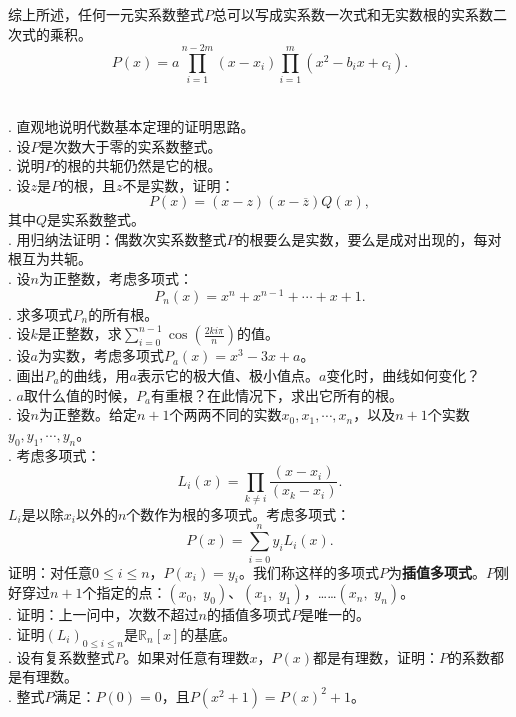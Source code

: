 \documentclass[12pt,UTF8,fontset=none]{ctexbook}
\begin{document}
\begin{appendix}
综上所述，任何一元实系数整式$P$总可以写成实系数一次式和无实数根的实系数二次式的乘积。
$$ P(x) = a\prod_{i=1}^{n-2m}(x - x_i) \prod_{i=1}^m (x^2 - b_ix + c_i). $$

\begin{xt}
    \mbox{} \\
    . 直观地说明代数基本定理的证明思路。\\
    . 设$P$是次数大于零的实系数整式。\\
    . 说明$P$的根的共轭仍然是它的根。\\
    . 设$z$是$P$的根，且$z$不是实数，证明：
    $$ P(x) = (x - z)(x - \overline{z}) Q(x),$$
    其中$Q$是实系数整式。\\
    . 用归纳法证明：偶数次实系数整式$P$的根要么是实数，要么是成对出现的，每对根互为共轭。\\
    . 设$n$为正整数，考虑多项式：
    $$ P_n(x) = x^n + x^{n-1} + \cdots+ x + 1 . $$
    . 求多项式$P_n$的所有根。\\
    . 设$k$是正整数，求$\sum_{i=0}^{n-1}\cos{\left(\frac{2ki\pi}{n}\right)}$的值。\\
    . 设$a$为实数，考虑多项式$P_a(x) = x^3 - 3x + a$。\\
    . 画出$P_a$的曲线，用$a$表示它的极大值、极小值点。$a$变化时，曲线如何变化？\\
    . $a$取什么值的时候，$P_a$有重根？在此情况下，求出它所有的根。\\
    . 设$n$为正整数。给定$n+1$个两两不同的实数$x_0, x_1, \cdots, x_n$，以及$n+1$个实数$y_0, y_1, \cdots, y_n$。\\
    . 考虑多项式：
    $$ L_i(x) = \prod_{k\neq i}\frac{(x - x_i)}{(x_k - x_i)}.$$
    $L_i$是以除$x_i$以外的$n$个数作为根的多项式。考虑多项式：
    $$ P(x) = \sum_{i=0}^n y_i L_i(x).$$
    证明：对任意$0\leqslant i\leqslant n$，$P(x_i) = y_i$。我们称这样的多项式$P$为\textbf{插值多项式}。$P$刚好穿过$n+1$个指定的点：$(x_0,\,\,y_0)$、$(x_1,\,\,y_1)$，……$(x_n,\,\,y_n)$。\\
    . 证明：上一问中，次数不超过$n$的插值多项式$P$是唯一的。\\
    . 证明$\left(L_i\right)_{0\leqslant i \leqslant n}$是$\mathbb{R}_n[x]$的基底。\\
    . 设有复系数整式$P$。如果对任意有理数$x$，$P(x)$都是有理数，证明：$P$的系数都是有理数。\\
    . 整式$P$满足：$P(0)=0$，且$P(x^2 + 1) = P(x)^2 + 1$。\\

\end{xt}
\end{appendix}
\end{document}
